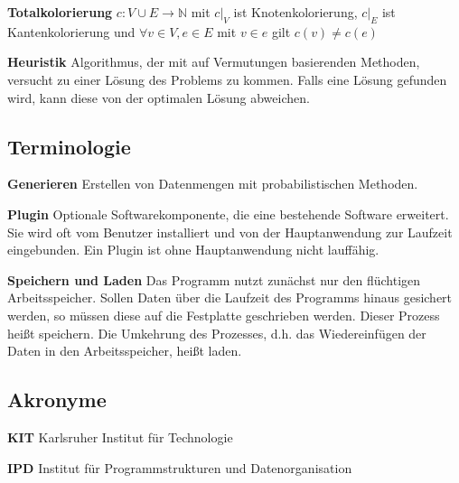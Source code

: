 \documentclass{article}
\begin{document}
	\hangindent=1.5cm 
	\textbf{Totalkolorierung} \newline
	$c: V \cup E \to \mathbb N$ mit $c \vert _V$ ist Knotenkolorierung, $c \vert_E$ ist Kantenkolorierung und $\forall v \in V, e \in E$ mit $v \in e$ gilt $c(v) \neq c(e)$
	
	\hangindent=1.5cm 
	\textbf{Heuristik} \newline
	Algorithmus, der mit auf Vermutungen basierenden Methoden, versucht zu einer Lösung des Problems zu kommen. Falls eine Lösung gefunden wird, kann diese von der optimalen Lösung abweichen.
	
	\subsection{Terminologie}
	
	\hangindent=1.5cm 
	\textbf{Generieren} \newline
	Erstellen von Datenmengen mit probabilistischen Methoden.
	
	\hangindent=1.5cm 
	\textbf{Plugin} \newline
	Optionale Softwarekomponente, die eine bestehende Software erweitert. Sie wird oft vom Benutzer installiert und von der Hauptanwendung zur Laufzeit eingebunden. Ein Plugin ist ohne Hauptanwendung nicht lauffähig.
	
	\hangindent=1.5cm 
	\textbf{Speichern und Laden} \newline
	Das Programm nutzt zunächst nur den flüchtigen Arbeitsspeicher. Sollen Daten über die Laufzeit des Programms hinaus gesichert werden, so müssen diese auf die Festplatte geschrieben werden. Dieser Prozess heißt speichern. Die Umkehrung des Prozesses, d.h. das Wiedereinfügen der Daten in den Arbeitsspeicher, heißt laden.
	
	\subsection{Akronyme}
	
	\textbf{KIT} Karlsruher Institut für Technologie
	
	\textbf{IPD} Institut für Programmstrukturen und Datenorganisation
	
\end{document}
